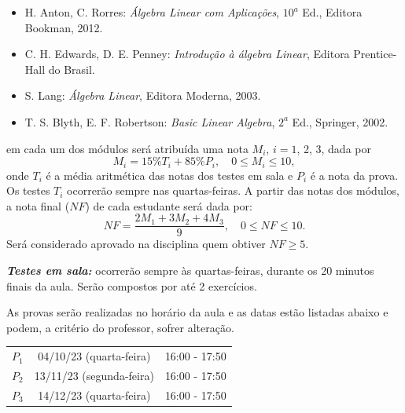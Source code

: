 \documentclass[12pt]{exam}
\begin{document}
\vspace{0.5cm}
\begin{itemize}


    \item H. Anton, C. Rorres: {\it Álgebra Linear com Aplicações}, $10^a$ Ed., Editora Bookman, 2012.

    \item C. H. Edwards, D. E. Penney: {\it Introdução à álgebra Linear}, Editora Prentice-Hall do Brasil.

    \item S. Lang: {\it Álgebra Linear}, Editora Moderna, 2003.

    \item T. S. Blyth, E. F. Robertson: {\it Basic Linear Algebra}, $2^a$ Ed., Springer, 2002.
\end{itemize}

 em cada um dos módulos será atribuída uma nota $M_i$, $i=1$, 2, 3, dada por
\[
    M_i = 15\%T_i + 85\%P_i, \quad 0 \le M_i \le 10,
\]
onde $T_i$ é a média aritmética das notas dos testes em sala e $P_i$ é a nota da prova. Os testes $T_i$ ocorrerão sempre nas quartas-feiras.
A partir das notas dos módulos, a nota final ($NF$) de cada estudante será dada por:
\[
    NF = \dfrac{2M_1 + 3M_2 + 4M_3}{9}, \quad 0 \le NF \le 10.
\]
Será considerado aprovado na disciplina quem obtiver $NF \ge 5$.

\vspace{0.5cm}

\noindent \textbf{\textit{Testes em sala:}} ocorrerão sempre às quartas-feiras, durante os 20 minutos finais da aula. Serão compostos por até 2 exercícios.


As provas serão realizadas no horário da aula e as datas estão listadas abaixo e podem, a critério do professor, sofrer alteração.

\begin{center}
    \begin{tabular}{c|c|c}
        \hline\hline
        \hspace{1cm}{\bf Prova}\hspace{1cm} & \hspace{3cm}{\bf Data}\hspace{3cm} & \hspace{1.7cm}{\bf Horário}\hspace{1.7cm} \\
        \hline\hline
        $P_1$ & 04/10/23 (quarta-feira) \phantom{x} & 16:00 - 17:50 \\
        \hline
        $P_2$ & 13/11/23 (segunda-feira) \phantom{x} & 16:00 - 17:50 \\
        \hline
        $P_3$ & 14/12/23 (quarta-feira) \phantom{x} & 16:00 - 17:50 \\
        \hline\hline
    \end{tabular}
\end{center}
\end{document}

